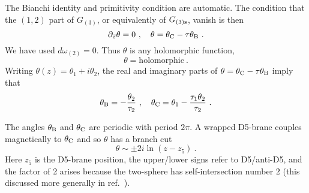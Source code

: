 \documentclass[a4paper,12pt]{article}
\renewcommand{\=}[1]{\bar{#1}}
\begin{document}
The Bianchi identity and primitivity condition are automatic.  The condition
that the $(1,2)$ part of $G_{(3)}$, or equivalently of $G_{(3)\rm s}$, vanish is
then
\begin{equation}
\partial_{\bar z} \theta = 0\ ,\quad \theta =  \theta_{\rm C} - \tau \theta_{\rm
B}\ .
\end{equation}
We have used $d \omega_{(2)} = 0$.  Thus $\theta$ is any holomorphic
function,
\begin{equation}
\theta = \mbox{holomorphic}\ .\label{holoth}
\end{equation}
Writing $\theta(z) = \theta_1 + i \theta_2$, the real and
imaginary parts of $\theta =  \theta_{\rm C} - \tau \theta_{\rm
B}$ imply that
\begin{equation}
\theta_{\rm B} = -\frac{\theta_2}{\tau_2}\ , \quad
\theta_{\rm C} = \theta_1 - \frac{\tau_1 \theta_2}{\tau_2} \ .
\end{equation}

The angles $\theta_{\rm B}$ and $\theta_{\rm C}$ are periodic with period
$2\pi$.  A wrapped D5-brane couples magnetically to $\theta_{\rm C}$
and so $\theta$ has a branch cut
\begin{equation}
\theta \sim \pm 2 i \ln(z - z_{5})\ .
\end{equation}
Here $z_5$ is the D5-brane position, the upper/lower signs refer
to D5/anti-D5, and the factor of 2 arises because the two-sphere has
self-intersection number $2$ (this discussed more generally in
ref.~\cite{GK-KN}).
\end{document}
